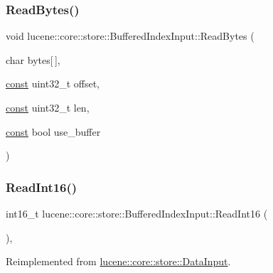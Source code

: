 \subsubsection{\texorpdfstring{Read\+Bytes()}{ReadBytes()}\hspace{0.1cm}{\footnotesize\ttfamily [2/2]}}
{\footnotesize\ttfamily void lucene\+::core\+::store\+::\+Buffered\+Index\+Input\+::\+Read\+Bytes (\begin{DoxyParamCaption}\item[{char}]{bytes\mbox{[}$\,$\mbox{]},  }\item[{\mbox{\hyperlink{ZlibCrc32_8h_a2c212835823e3c54a8ab6d95c652660e}{const}} uint32\+\_\+t}]{offset,  }\item[{\mbox{\hyperlink{ZlibCrc32_8h_a2c212835823e3c54a8ab6d95c652660e}{const}} uint32\+\_\+t}]{len,  }\item[{\mbox{\hyperlink{ZlibCrc32_8h_a2c212835823e3c54a8ab6d95c652660e}{const}} bool}]{use\+\_\+buffer }\end{DoxyParamCaption})\hspace{0.3cm}{\ttfamily [inline]}}

\mbox{\label{classlucene_1_1core_1_1store_1_1BufferedIndexInput_ae3c6ec72361c91307e01899da55df4b2}} 
\subsubsection{\texorpdfstring{Read\+Int16()}{ReadInt16()}\hspace{0.1cm}{\footnotesize\ttfamily [1/2]}}
{\footnotesize\ttfamily int16\+\_\+t lucene\+::core\+::store\+::\+Buffered\+Index\+Input\+::\+Read\+Int16 (\begin{DoxyParamCaption}{ }\end{DoxyParamCaption})\hspace{0.3cm}{\ttfamily [inline]}, {\ttfamily [virtual]}}



Reimplemented from \mbox{\hyperlink{classlucene_1_1core_1_1store_1_1DataInput_aeb6d3697693dac6f16a2df5e3f50091d}{lucene\+::core\+::store\+::\+Data\+Input}}.

\mbox{\label{classlucene_1_1core_1_1store_1_1BufferedIndexInput_a76ab5a2911c939f267245b35e69e779e}} 
